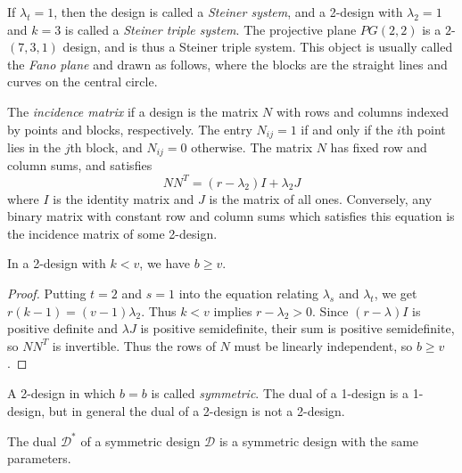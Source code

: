 If $\lambda_t=1$, then the design is called a \textit{Steiner system}, and a 2-design with $\lambda_2=1$ and $k=3$ is called a \textit{Steiner triple system}.  The projective plane $PG(2,2)$ is a $2$-$(7,3,1)$ design, and is thus a Steiner triple system.  This object is usually called the \textit{Fano plane} and drawn as follows, where the blocks are the straight lines and curves on the central circle.


The \textit{incidence matrix} if a design is the matrix $N$ with rows and columns indexed by points and blocks, respectively.  The entry $N_{ij}=1$ if and only if the $i$th point lies in the $j$th block, and $N_{ij}=0$ otherwise.  The matrix $N$ has fixed row and column sums, and satisfies
$$NN^T=(r-\lambda_2)I+\lambda_2 J$$
where $I$ is the identity matrix and $J$ is the matrix of all ones.  Conversely, any binary matrix with constant row and column sums which satisfies this equation is the incidence matrix of some 2-design.

\begin{lemma}
	In a 2-design with $k<v$, we have $b\geq v$.
\end{lemma}
\begin{proof}
	Putting $t=2$ and $s=1$ into the equation relating $\lambda_s$ and $\lambda_t$, we get $r(k-1)=(v-1)\lambda_2$.  Thus $k<v$ implies $r-\lambda_2 >0$.  Since $(r-\lambda)I$ is positive definite and $\lambda J$ is positive semidefinite, their sum is positive semidefinite, so $NN^T$ is invertible.  Thus the rows of $N$ must be linearly independent, so $b\geq v$.
\end{proof}
A 2-design in which $b=b$ is called \textit{symmetric}.  The dual of a 1-design is a 1-design, but in general the dual of a 2-design is not a 2-design.

\begin{lemma}
	The dual $\mathcal{D}^*$ of a symmetric design $\mathcal{D}$ is a symmetric design with the same parameters.
\end{lemma}

